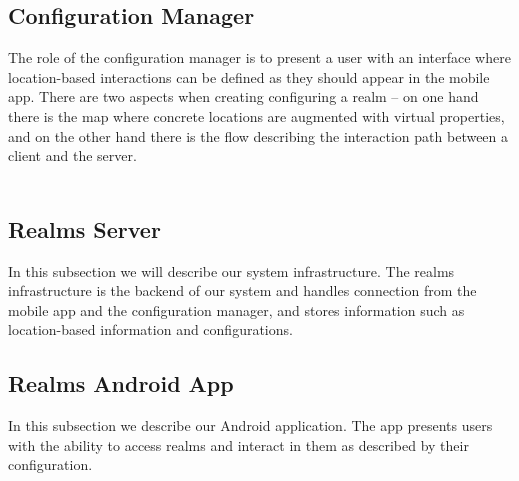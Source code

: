 \subsection{Configuration Manager} %
\label{sub:configuration_manager}
The role of the configuration manager is to present a user with an interface where location-based interactions can be defined as they should appear in the mobile app. There are two aspects when creating configuring a realm -- on one hand there is the map where concrete locations are augmented with virtual properties, and on the other hand there is the flow describing the interaction path between a client and the server.
\\\\


\subsection{Realms Server} %
\label{sub:realms_infrastructure}
In this subsection we will describe our system infrastructure. The realms infrastructure is the backend of our system and handles connection from the mobile app and the configuration manager, and stores information such as location-based information and configurations.

\subsection{Realms Android App} %
\label{sub:realms_android_app}
In this subsection we describe our Android application. The app presents users with the ability to access realms and interact in them as described by their configuration.
